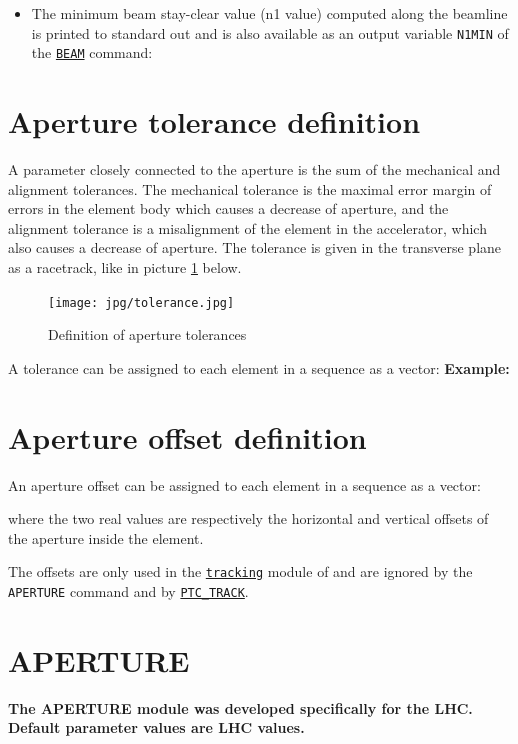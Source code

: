 \begin{itemize}
   \item The minimum beam stay-clear value (n1 value) computed along the 
     beamline is printed to standard out and is also available as an output 
     variable \texttt{N1MIN} of the \hyperref[sec:beam]{\texttt{BEAM}} command: 

\end{itemize}

\section{Aperture tolerance definition}
\label{sec:apertol}
A parameter closely connected to the aperture is the sum of the
mechanical and alignment tolerances. The mechanical tolerance is 
the maximal error margin of errors in the element body which 
causes a decrease of aperture, and the alignment tolerance is a 
misalignment of the element in the accelerator, which also causes a 
decrease of aperture. The tolerance is given in the transverse plane 
as a racetrack, like in picture \ref{fig:aperture-tol} below. 

\begin{figure}[htb]
  \centering
  \texttt{[image: jpg/tolerance.jpg]}
  \caption{Definition of aperture tolerances}
  \label{fig:aperture-tol}
\end{figure}

A tolerance can be assigned to each element in a \madx sequence as a vector: 
\textbf{Example:}

\section{Aperture offset definition}
\label{sec:aperoffset}

An aperture offset can be assigned to each element in a \madx sequence as a vector: 

where the two real values are respectively the horizontal and vertical
offsets of the aperture inside the element. 

The offsets are only used in the
\hyperref[chap:thintrack]{\texttt{tracking}}  
module of \madx and are ignored by the \texttt{APERTURE} command and by 
\hyperref[sec:ptc-track]{\texttt{PTC\_TRACK}}.


\section{APERTURE}
\label{sec:aperture}
\textbf{The APERTURE module was developed specifically for the LHC.\\ 
Default parameter values are LHC values.} 


